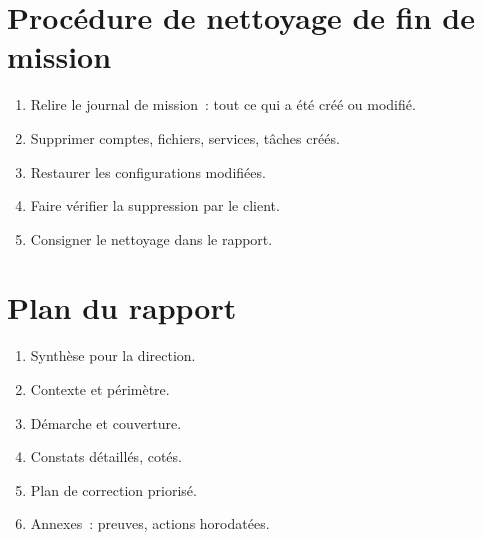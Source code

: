 \section*{Procédure de nettoyage de fin de mission}

\begin{enumerate}
    \item Relire le journal de mission~: tout ce qui a été créé ou modifié.
    \item Supprimer comptes, fichiers, services, tâches créés.
    \item Restaurer les configurations modifiées.
    \item Faire vérifier la suppression par le client.
    \item Consigner le nettoyage dans le rapport.
\end{enumerate}

\section*{Plan du rapport}

\begin{enumerate}
    \item Synthèse pour la direction.
    \item Contexte et périmètre.
    \item Démarche et couverture.
    \item Constats détaillés, cotés.
    \item Plan de correction priorisé.
    \item Annexes~: preuves, actions horodatées.
\end{enumerate}
